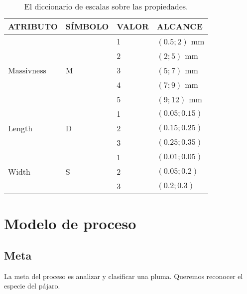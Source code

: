 \documentclass[a4paper,12pt]{article}
\begin{document}
\begin{table}[H]
	\centering
	\begin{tabular}{|l|l|l|l|}
		\hline
		ATRIBUTO                    & SÍMBOLO            & VALOR & ALCANCE       \\ \hline\hline
		\multirow{5}{*}{Massivness} & \multirow{5}{*}{M} & 1     & $(0.5;2)$ mm  \\ \cline{3-4}
		                            &                    & 2     & $(2;5)$ mm    \\ \cline{3-4}
		                            &                    & 3     & $(5;7)$ mm    \\ \cline{3-4}
		                            &                    & 4     & $(7;9)$ mm    \\ \cline{3-4}
		                            &                    & 5     & $(9;12)$ mm   \\ \hline\hline
		\multirow{3}{*}{Length}     & \multirow{3}{*}{D} & 1     & $(0.05;0.15)$ \\ \cline{3-4}
		                            &                    & 2     & $(0.15;0.25)$ \\ \cline{3-4}
		                            &                    & 3     & $(0.25;0.35)$ \\ \hline\hline
		\multirow{3}{*}{Width}      & \multirow{3}{*}{S} & 1     & $(0.01;0.05)$ \\ \cline{3-4}
		                            &                    & 2     & $(0.05;0.2)$  \\ \cline{3-4}
		                            &                    & 3     & $(0.2;0.3)$   \\ \hline
	\end{tabular}
	\caption{El diccionario de escalas sobre las propiedades.}
\end{table}

\section{Modelo de proceso}
\subsection{Meta}
La meta del proceso es analizar y clasificar una pluma. Queremos reconocer el especie del pájaro.
\end{document}
